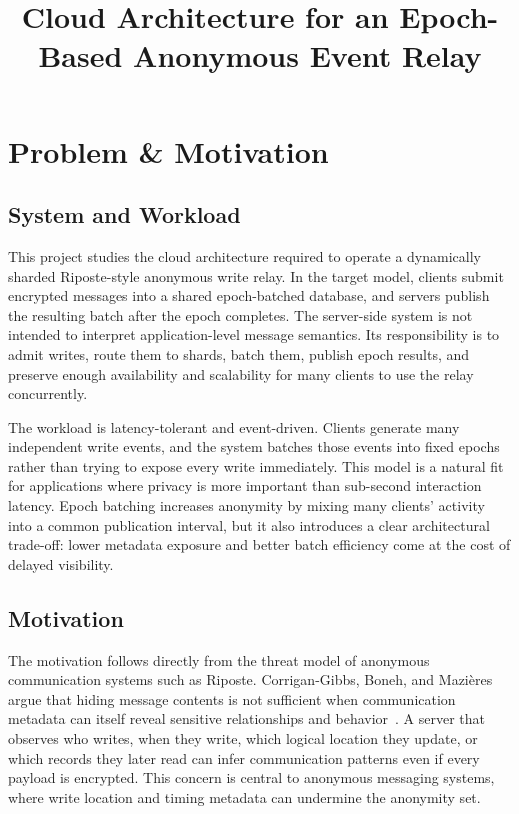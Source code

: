 \documentclass[conference]{IEEEtran}
\title{Cloud Architecture for an Epoch-Based Anonymous Event Relay}
\author{
\IEEEauthorblockN{Kevin Jin, John Yun}
\IEEEauthorblockA{Department of Computer Science\\
}
}
\begin{document}
\maketitle

\section{Problem \& Motivation}

\subsection{System and Workload}

This project studies the cloud architecture required to operate a dynamically sharded Riposte-style anonymous write relay. In the target model, clients submit encrypted messages into a shared epoch-batched database, and servers publish the resulting batch after the epoch completes. The server-side system is not intended to interpret application-level message semantics. Its responsibility is to admit writes, route them to shards, batch them, publish epoch results, and preserve enough availability and scalability for many clients to use the relay concurrently.

The workload is latency-tolerant and event-driven. Clients generate many independent write events, and the system batches those events into fixed epochs rather than trying to expose every write immediately. This model is a natural fit for applications where privacy is more important than sub-second interaction latency. Epoch batching increases anonymity by mixing many clients' activity into a common publication interval, but it also introduces a clear architectural trade-off: lower metadata exposure and better batch efficiency come at the cost of delayed visibility.

\subsection{Motivation}

The motivation follows directly from the threat model of anonymous communication systems such as Riposte. Corrigan-Gibbs, Boneh, and Mazi\`eres argue that hiding message contents is not sufficient when communication metadata can itself reveal sensitive relationships and behavior~\cite{riposte}. A server that observes who writes, when they write, which logical location they update, or which records they later read can infer communication patterns even if every payload is encrypted. This concern is central to anonymous messaging systems, where write location and timing metadata can undermine the anonymity set.
\end{document}
